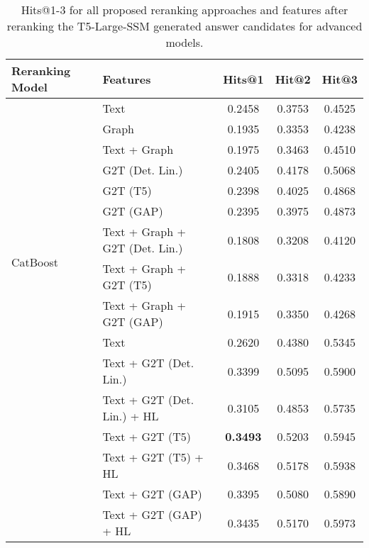 \begin{table}[htbp]
    \caption{Hits@1-3 for all proposed reranking approaches and features after reranking the T5-Large-SSM generated answer candidates for advanced models.}
    \label{tab:controllable_fusion:t5_large_ssm_all_results2}
    \centering
    \begin{tabular}{l p{6cm} c c c}
        \toprule
        \textbf{Reranking Model} & \textbf{Features} & \textbf{Hits@1} & \textbf{Hit@2} & \textbf{Hit@3} \\
        \midrule
        \multirow{12}{*}{CatBoost} & Text & 0.2458 & 0.3753 & 0.4525 \\
        & Graph & 0.1935 & 0.3353 & 0.4238 \\
        & Text + Graph & 0.1975 & 0.3463 & 0.4510 \\
        & G2T (Det. Lin.) & 0.2405 & 0.4178 & 0.5068 \\
        & G2T (T5) & 0.2398 & 0.4025 & 0.4868 \\
        & G2T (GAP) & 0.2395 & 0.3975 & 0.4873 \\
        & Text + Graph + G2T (Det. Lin.) & 0.1808 & 0.3208 & 0.4120 \\
        & Text + Graph + G2T (T5) & 0.1888 & 0.3318 & 0.4233 \\
        & Text + Graph + G2T (GAP) & 0.1915 & 0.3350 & 0.4268 \\
        \midrule
        \multirow{10}{*}{MPNet} & Text & 0.2620 & 0.4380 & 0.5345 \\
        & Text + G2T (Det. Lin.) & 0.3399 & 0.5095 & 0.5900 \\
        & Text + G2T (Det. Lin.) + HL & 0.3105 & 0.4853 & 0.5735 \\
        & Text + G2T (T5) & \textbf{0.3493} & 0.5203 & 0.5945 \\
        & Text + G2T (T5) + HL & 0.3468 & 0.5178 & 0.5938 \\
        & Text + G2T (GAP) & 0.3395 & 0.5080 & 0.5890 \\
        & Text + G2T (GAP) + HL & 0.3435 & 0.5170 & 0.5973 \\
        \bottomrule
    \end{tabular}
\end{table}


